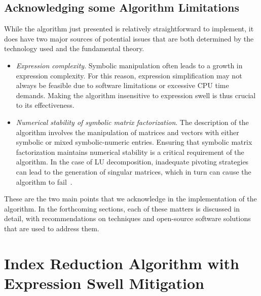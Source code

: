 \subsection{Acknowledging some Algorithm Limitations}

While the algorithm just presented is relatively straightforward to implement, it does have two major sources of potential issues that are both determined by the technology used and the fundamental theory.
%
\begin{itemize}
    \item \emph{Expression complexity}. Symbolic manipulation often leads to a growth in expression complexity. For this reason, expression simplification may not always be feasible due to software limitations or excessive CPU time demands. Making the algorithm insensitive to expression swell is thus crucial to its effectiveness.
    \item \emph{Numerical stability of symbolic matrix factorization}. The description of the algorithm involves the manipulation of matrices and vectors with either symbolic or mixed symbolic-numeric entries. Ensuring that symbolic matrix factorization maintains numerical stability is a critical requirement of the algorithm. In the case of \ac{LU} decomposition, inadequate pivoting strategies can lead to the generation of singular matrices, which in turn can cause the algorithm to fail~\cite{zhou2005implicit, zhou2007symbolic, giesbrecht2014symbolic}.
\end{itemize}
%
These are the two main points that we acknowledge in the implementation of the algorithm. In the forthcoming sections, each of these matters is discussed in detail, with recommendations on techniques and open-source software solutions that are used to address them.

\section{Index Reduction Algorithm with Expression Swell Mitigation}

